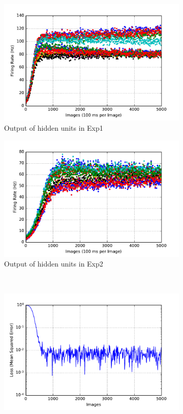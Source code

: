 \begin{figure}
\begin{subfigure}[t]{0.4\textwidth}
		\includegraphics[width=\textwidth]{pics_sdlm/07_exp_SAE_all_long/exp1_hid_s.pdf}
		\caption{Output of hidden units in Exp1}
	\end{subfigure}
	\begin{subfigure}[t]{0.4\textwidth}
		\includegraphics[width=\textwidth]{pics_sdlm/07_exp_SAE_all_long/exp2_hid_s.pdf}
		\caption{Output of hidden units in Exp2}
	\end{subfigure}\\
	\begin{subfigure}[t]{0.4\textwidth}
		\includegraphics[width=\textwidth]{pics_sdlm/07_exp_SAE_all_long/exp1_mse_nons.pdf}

\end{subfigure}
\end{figure}
